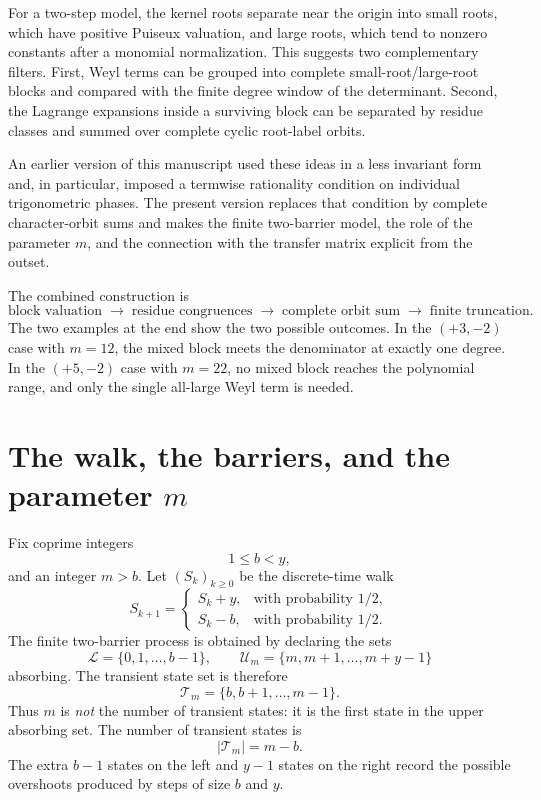 \documentclass[11pt]{amsart}
\theoremstyle{remark}
\begin{document}
For a two-step model, the kernel roots separate near the origin into small roots, which have positive Puiseux valuation, and large roots, which tend to nonzero constants after a monomial normalization.  This suggests two complementary filters.  First, Weyl terms can be grouped into complete small-root/large-root blocks and compared with the finite degree window of the determinant.  Second, the Lagrange expansions inside a surviving block can be separated by residue classes and summed over complete cyclic root-label orbits.

An earlier version of this manuscript used these ideas in a less invariant form and, in particular, imposed a termwise rationality condition on individual trigonometric phases.  The present version replaces that condition by complete character-orbit sums and makes the finite two-barrier model, the role of the parameter $m$, and the connection with the transfer matrix explicit from the outset.

The combined construction is
\[
\boxed{
\text{block valuation}
\;\longrightarrow\;
\text{residue congruences}
\;\longrightarrow\;
\text{complete orbit sum}
\;\longrightarrow\;
\text{finite truncation}.}
\]
The two examples at the end show the two possible outcomes.  In the $(+3,-2)$ case with $m=12$, the mixed block meets the denominator at exactly one degree.  In the $(+5,-2)$ case with $m=22$, no mixed block reaches the polynomial range, and only the single all-large Weyl term is needed.

\section{The walk, the barriers, and the parameter \texorpdfstring{$m$}{m}}\label{sec:model}

Fix coprime integers
\[
    1\le b<y,
\]
and an integer $m>b$.  Let $(S_k)_{k\ge0}$ be the discrete-time walk
\begin{equation}\label{eq:walk}
    S_{k+1}=\begin{cases}
        S_k+y,&\text{with probability }1/2,\\
        S_k-b,&\text{with probability }1/2.
    \end{cases}
\end{equation}
The finite two-barrier process is obtained by declaring the sets
\begin{equation}\label{eq:absorbing-sets}
    \mathcal L=\{0,1,\ldots,b-1\},
    \qquad
    \mathcal U_m=\{m,m+1,\ldots,m+y-1\}
\end{equation}
absorbing.  The transient state set is therefore
\begin{equation}\label{eq:transient-set}
    \mathcal T_m=\{b,b+1,\ldots,m-1\}.
\end{equation}
Thus $m$ is \emph{not} the number of transient states: it is the first state in the upper absorbing set.  The number of transient states is
\begin{equation}\label{eq:transient-count}
    |\mathcal T_m|=m-b.
\end{equation}
The extra $b-1$ states on the left and $y-1$ states on the right record the possible overshoots produced by steps of size $b$ and $y$.
\end{document}
